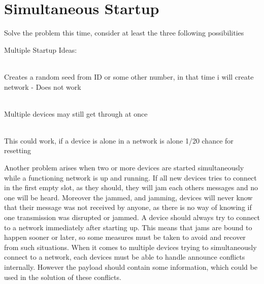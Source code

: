 \section{Simultaneous Startup} %
\label{sec:simultaneous_startup}

Solve the problem this time, consider at least the three following possibilities

\noindent
Multiple Startup Ideas:

\begin{description}[labelindent=\parindent]
    \item[Random Seed]\hfill\\ 
    Creates a random seed from ID or some other number, in that time i will create network - Does not work

    \item[Chante to create]\hfill\\
    Multiple devices may still get through at once

    \item[Reset if alone]\hfill\\
    This could work, if a device is alone in a network is alone  1/20 chance for resetting
\end{description}   

\noindent
Another problem arises when two or more devices are started simultaneously while a functioning network is up and running.
If all new devices tries to connect in the first empty slot, as they should, they will jam each others messages and no one will be heard.
Moreover the jammed, and jamming, devices will never know that their message was not received by anyone, as there is no way of knowing if one transmission was disrupted or jammed.
A device should always try to connect to a network immediately after starting up.
This means that jams are bound to happen sooner or later, so some measures must be taken to avoid and recover from such situations.
When it comes to multiple devices trying to simultaneously connect to a network, each devices must be able to handle announce conflicts internally.
However the payload should contain some information, which could be used in the solution of these conflicts.

